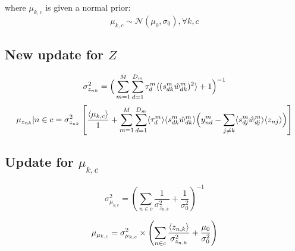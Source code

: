 \documentclass[10pt, a4paper,openany]{report}
\begin{document}
where $\mu_{k, c}$ is given a normal prior:
\begin{equation}
  \mu_{k, c} \sim \mathcal{N} (\mu_0, \sigma_0), \forall k, c
\end{equation}

\subsection{New update for $Z$}
\begin{equation*}
\sigma_{z_{nk}}^2 = \Big( \sum_{m=1}^{M} \sum_{d=1}^{D_m} \tau_d^m \langle (s_{dk}^m\hat{w}_{dk}^m)^2 \rangle + 1 \Big)^{-1}
\end{equation*}
\begin{equation*}
\mu_{z_{nk}} | n \in c = \sigma_{z_{nk}}^2 \left[ \frac{\langle \mu_{k,c} \rangle}{1} + \sum_{m=1}^{M} \sum_{d=1}^{D_m} \langle\tau_d^m\rangle \langle s_{dk}^m\hat{w}_{dk}^m \rangle \Big( y_{nd}^m - \sum_{j \neq k} \langle s_{dj}^m \hat{w}_{dj}^m \rangle \langle z_{nj} \rangle \Big)\right]
\end{equation*}


\subsection{Update for $\mu_{k, c}$}
\begin{equation*}
  \sigma^2_{\mu_{k, c}} = \left(\sum_{n\in c} \frac{1}{\sigma^2_{z_{n,k}}} + \frac{1}{\sigma_0^2}\right)^{-1}
\end{equation*}

\begin{equation*}
  \mu_{\mu_{k, c}} = \sigma^2_{\mu_{k, c}}\times \left( \sum_{n \in c} \frac{\langle z_{n,k} \rangle}{\sigma^2_{z_{n,k}}} + \frac{\mu_0}{\sigma^2_0} \right)
\end{equation*}
\end{document}
